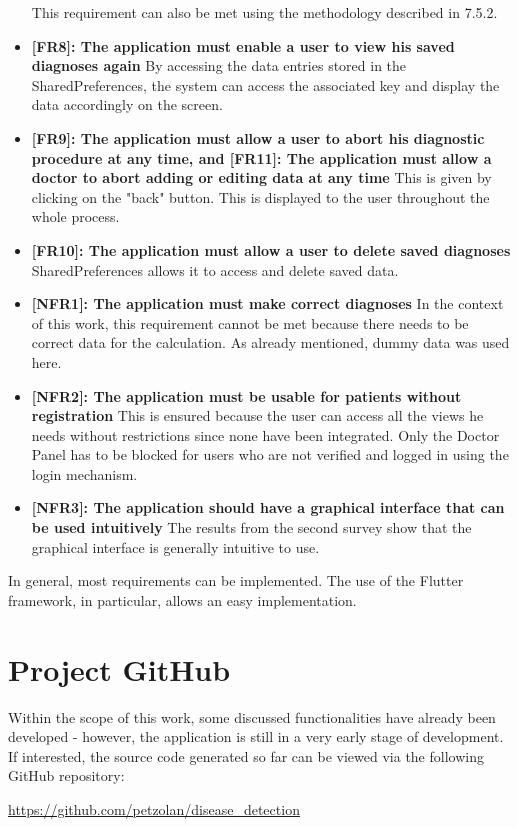 \begin{itemize}
	\newline
	This requirement can also be met using the methodology described in 7.5.2.
	\item \textbf{[FR8]: The application must enable a user to view his saved diagnoses again}
	\newline
	By accessing the data entries stored in the SharedPreferences, the system can access the associated key and display the data accordingly on the screen.
	\item \textbf{[FR9]: The application must allow a user to abort his diagnostic procedure at any time, and [FR11]: The application must allow a doctor to abort adding or editing data at any time}
	\newline
	This is given by clicking on the "back" button. This is displayed to the user throughout the whole process.
	\item \textbf{[FR10]: The application must allow a user to delete saved diagnoses}
	\newline
	SharedPreferences allows it to access and delete saved data.
	\item \textbf{[NFR1]: The application must make correct diagnoses}
	\newline
	In the context of this work, this requirement cannot be met because there needs to be correct data for the calculation. As already mentioned, dummy data was used here.
	\item \textbf{[NFR2]: The application must be usable for patients without registration}
	\newline
	This is ensured because the user can access all the views he needs without restrictions since none have been integrated. Only the Doctor Panel has to be blocked for users who are not verified and logged in using the login mechanism.
	\item \textbf{[NFR3]: The application should have a graphical interface that can be used intuitively}
	\newline
	The results from the second survey show that the graphical interface is generally intuitive to use.
\end{itemize}
In general, most requirements can be implemented. The use of the Flutter framework, in particular, allows an easy implementation.
\section{Project GitHub}
Within the scope of this work, some discussed functionalities have already been developed - however, the application is still in a very early stage of development. If interested, the source code generated so far can be viewed via the following GitHub repository:
\begin{center}
\url{https://github.com/petzolan/disease_detection}
\end{center}



